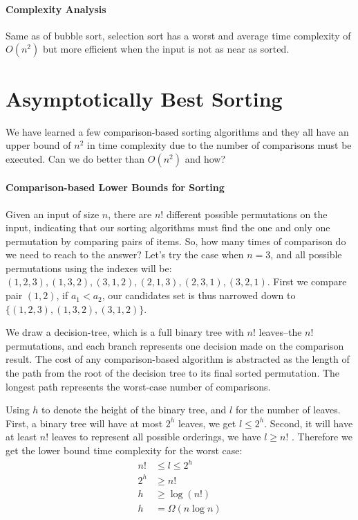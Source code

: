 \documentclass[../main.tex]{subfiles}
\begin{document}
\paragraph{Complexity Analysis} Same as of bubble sort, selection sort has a worst and average time complexity of $O(n^2)$ but more efficient when the input is not as near as sorted. 
\section{Asymptotically Best Sorting}
\label{o_n_log_n_sorting}
We have learned a few comparison-based sorting algorithms and they all have an upper bound of $n^2$ in time complexity due to the number of comparisons must be executed. Can we do better than $O(n^2)$ and how? 

\paragraph{Comparison-based Lower Bounds for Sorting} Given an input of size $n$, there are $n!$ different possible permutations on the input, indicating that our sorting algorithms must find the one and only one permutation by comparing pairs of items. So, how many times of comparison do we need to reach to the answer? Let's try the case when $n=3$, and all possible permutations using the indexes will be: $(1,2,3), (1,3,2), (3,1,2), (2,1,3), (2,3,1),(3,2,1)$. First we compare pair $(1,2)$, if $a_1 < a_2$, our candidates set is thus narrowed down to $\{(1,2,3), (1,3,2), (3,1,2)\}$. 

We draw a decision-tree, which is a full binary tree with $n!$ leaves--the $n!$ permutations, and each branch represents one decision made on the comparison result. The cost of any comparison-based algorithm is abstracted as the length of the path from the root of the decision tree to its final sorted permutation. The longest path represents the worst-case number of comparisons. 

Using $h$ to denote the height of the binary tree, and $l$ for the number of leaves. First, a binary tree will have at most $2^h$ leaves, we get $l \leq 2^h$. Second, it will have at least $n!$ leaves to represent all possible orderings, we have $l \geq n!$ . Therefore we get the lower bound time complexity for the worst case:
\begin{align}
n! &\leq l \leq 2^h \\
    2^h &\ge n!\\
    h &\ge \log(n!) \\
    h &= \Omega(n\log n)
\end{align}
\end{document}

